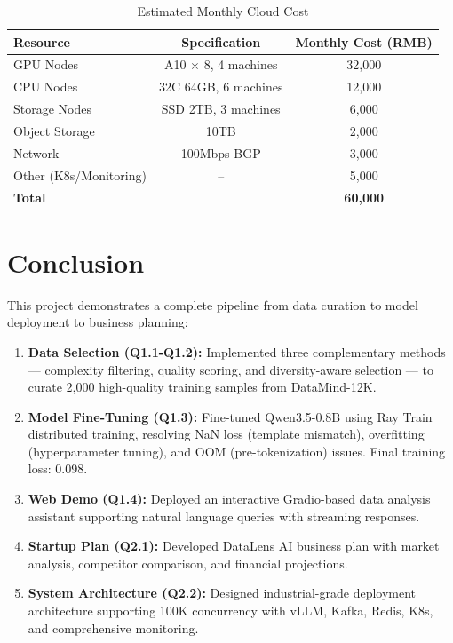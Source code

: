 \documentclass[12pt,a4paper]{article}
\begin{document}
\begin{table}[H]
\centering
\caption{Estimated Monthly Cloud Cost}
\begin{tabular}{lcc}
\toprule
\textbf{Resource} & \textbf{Specification} & \textbf{Monthly Cost (RMB)} \\
\midrule
GPU Nodes & A10 $\times$ 8, 4 machines & 32,000 \\
CPU Nodes & 32C 64GB, 6 machines & 12,000 \\
Storage Nodes & SSD 2TB, 3 machines & 6,000 \\
Object Storage & 10TB & 2,000 \\
Network & 100Mbps BGP & 3,000 \\
Other (K8s/Monitoring) & -- & 5,000 \\
\midrule
\textbf{Total} & & \textbf{60,000} \\
\bottomrule
\end{tabular}
\end{table}

\section{Conclusion}

This project demonstrates a complete pipeline from data curation to model deployment to business planning:

\begin{enumerate}[leftmargin=*]
    \item \textbf{Data Selection (Q1.1-Q1.2):} Implemented three complementary methods — complexity filtering, quality scoring, and diversity-aware selection — to curate 2,000 high-quality training samples from DataMind-12K.
    \item \textbf{Model Fine-Tuning (Q1.3):} Fine-tuned Qwen3.5-0.8B using Ray Train distributed training, resolving NaN loss (template mismatch), overfitting (hyperparameter tuning), and OOM (pre-tokenization) issues. Final training loss: 0.098.
    \item \textbf{Web Demo (Q1.4):} Deployed an interactive Gradio-based data analysis assistant supporting natural language queries with streaming responses.
    \item \textbf{Startup Plan (Q2.1):} Developed DataLens AI business plan with market analysis, competitor comparison, and financial projections.
    \item \textbf{System Architecture (Q2.2):} Designed industrial-grade deployment architecture supporting 100K concurrency with vLLM, Kafka, Redis, K8s, and comprehensive monitoring.
\end{enumerate}
\end{document}
